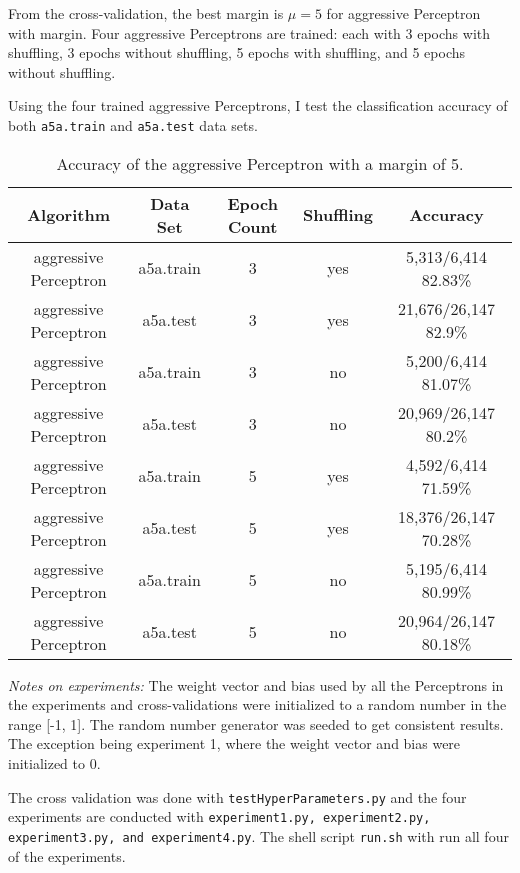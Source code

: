 \documentclass[11pt]{article}
\begin{document}
From the cross-validation, the best margin is $\mu = 5$ for aggressive Perceptron with margin. Four aggressive Perceptrons are trained: each with 3 epochs with shuffling, 3 epochs without shuffling, 5 epochs with shuffling, and 5 epochs without shuffling. \newline




 \newline

Using the four trained aggressive Perceptrons, I test the classification accuracy of both \texttt{a5a.train} and \texttt{a5a.test} data sets.

\begin{table}[H]
\centering
{\renewcommand{\arraystretch}{1.2}%
\begin{tabular}{| c | c | c | c | c |}
\hline
Algorithm& Data Set & Epoch Count & Shuffling & Accuracy\\
\hline
aggressive Perceptron & a5a.train & 3 & yes & 5,313/6,414 82.83\%\\ \hline
aggressive Perceptron & a5a.test & 3 & yes & 21,676/26,147 82.9\%\\ \hline
aggressive Perceptron & a5a.train & 3 & no & 5,200/6,414 81.07\%\\ \hline
aggressive Perceptron & a5a.test & 3 & no & 20,969/26,147 80.2\%\\ \hline
aggressive Perceptron & a5a.train & 5 & yes & 4,592/6,414 71.59\%\\ \hline
aggressive Perceptron & a5a.test & 5 & yes & 18,376/26,147 70.28\%\\ \hline
aggressive Perceptron & a5a.train & 5 & no & 5,195/6,414 80.99\%\\ \hline
aggressive Perceptron & a5a.test & 5 & no & 20,964/26,147 80.18\%\\ \hline
\end{tabular}}
\caption{Accuracy of the aggressive Perceptron with a margin of 5.}
\end{table}

\textit{Notes on experiments:} The weight vector and bias used by all the Perceptrons in the experiments and cross-validations were initialized to a random number in the range [-1, 1]. The random number generator was seeded to get consistent results. The exception being experiment 1, where the weight vector and bias were initialized to 0. 

The cross validation was done with \texttt{testHyperParameters.py} and the four experiments are conducted with \texttt{experiment1.py, experiment2.py, experiment3.py, and experiment4.py}. The shell script \texttt{run.sh} with run all four of the experiments.
\end{document}
